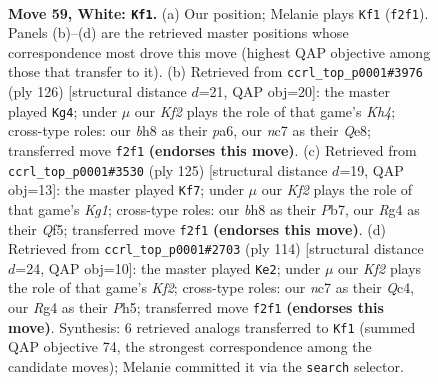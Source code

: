 \documentclass[11pt]{article}
\begin{document}
\clearpage

\begin{figure}[p]\centering
\begin{subfigure}{0.46\textwidth}\centering
\resizebox{\linewidth}{!}{%
\newchessgame
\chessboard[
  setfen={5k1b/2n2p2/7q/3P4/6R1/8/5K2/8 w - - 4 59},
  showmover=false,
  pgfstyle=straightmove, color=movearrow, markmove={f2-f1}
]}
\caption{}
\end{subfigure}\hfill
\begin{subfigure}{0.46\textwidth}\centering
\resizebox{\linewidth}{!}{%
\newchessgame
\chessboard[
  setfen={4Q3/8/pq1kp3/8/5P1K/8/8/8 w - - 5 64},
  showmover=false,
  pgfstyle=straightmove, color=movearrow, markmove={h4-g4}
]}
\caption{}
\end{subfigure}
\\[4pt]
\begin{subfigure}{0.46\textwidth}\centering
\resizebox{\linewidth}{!}{%
\newchessgame
\chessboard[
  setfen={6k1/1p6/8/5q2/p2Q4/P3K3/1P6/8 b - - 3 63},
  showmover=false,
  pgfstyle=straightmove, color=movearrow, markmove={g8-f7}
]}
\caption{}
\end{subfigure}\hfill
\begin{subfigure}{0.46\textwidth}\centering
\resizebox{\linewidth}{!}{%
\newchessgame
\chessboard[
  setfen={8/7k/8/7P/1pQ5/6P1/5K2/1q6 w - - 3 58},
  showmover=false,
  pgfstyle=straightmove, color=movearrow, markmove={f2-e2}
]}
\caption{}
\end{subfigure}
\caption{\textbf{Move 59, White: \texttt{Kf1}.} (a) Our position; Melanie plays \texttt{Kf1} (\texttt{f2f1}). Panels (b)--(d) are the retrieved master positions whose correspondence most drove this move (highest QAP objective among those that transfer to it). (b) Retrieved from \texttt{ccrl\_top\_p0001\#3976} (ply 126) [structural distance $d$=21, QAP obj=20]: the master played \texttt{Kg4}; under $\mu$ our \emph{Kf2} plays the role of that game's \emph{Kh4}; cross-type roles: our \emph{b}h8 as their \emph{p}a6, our \emph{n}c7 as their \emph{Q}e8; transferred move \texttt{f2f1} \textbf{(endorses this move)}. (c) Retrieved from \texttt{ccrl\_top\_p0001\#3530} (ply 125) [structural distance $d$=19, QAP obj=13]: the master played \texttt{Kf7}; under $\mu$ our \emph{Kf2} plays the role of that game's \emph{Kg1}; cross-type roles: our \emph{b}h8 as their \emph{P}b7, our \emph{R}g4 as their \emph{Q}f5; transferred move \texttt{f2f1} \textbf{(endorses this move)}. (d) Retrieved from \texttt{ccrl\_top\_p0001\#2703} (ply 114) [structural distance $d$=24, QAP obj=10]: the master played \texttt{Ke2}; under $\mu$ our \emph{Kf2} plays the role of that game's \emph{Kf2}; cross-type roles: our \emph{n}c7 as their \emph{Q}c4, our \emph{R}g4 as their \emph{P}h5; transferred move \texttt{f2f1} \textbf{(endorses this move)}. Synthesis: 6 retrieved analogs transferred to \texttt{Kf1} (summed QAP objective 74, the strongest correspondence among the candidate moves); Melanie committed it via the \texttt{search} selector.}
\label{fig:thought-m116}
\end{figure}
\end{document}

